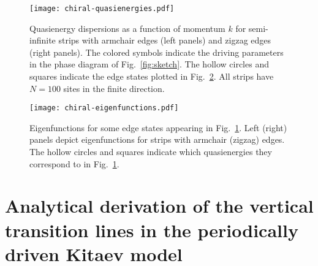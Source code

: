 \documentclass[aps,prb,twocolumn,superscriptaddress,groupedaddress]{revtex4}
\begin{document}
\begin{figure}[h]
\centering
\texttt{[image: chiral-quasienergies.pdf]}
\caption{Quasienergy dispersions as a function of momentum $k$ for semi-infinite strips with armchair edges (left panels) and zigzag edges (right panels). 
The colored symbols indicate the driving parameters in the phase diagram of Fig.~\ref{fig:sketch}.
The hollow circles and squares indicate the edge states plotted in Fig.~\ref{fig:chiral-eigenfunctions}.
All strips have $N=100$ sites in the finite direction.
}
\label{fig:chiral-quasienergies}
\end{figure}

\begin{figure}
\centering
\texttt{[image: chiral-eigenfunctions.pdf]}
\caption{Eigenfunctions for some edge states appearing in Fig.~\ref{fig:chiral-quasienergies}. Left (right) panels depict eigenfunctions for strips with armchair (zigzag) edges. The hollow circles and squares indicate which quasienergies they correspond to in Fig.~\ref{fig:chiral-quasienergies}.}
\label{fig:chiral-eigenfunctions}
\end{figure}


\section{Analytical derivation of the vertical transition lines in the periodically driven Kitaev model}
\label{app:vertical-lines}
\end{document}
